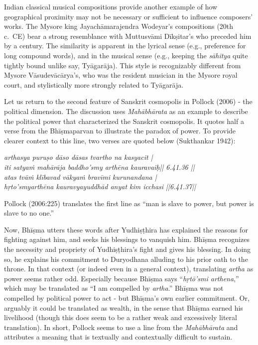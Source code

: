 Indian classical musical compositions provide another example of how geographical proximity may not be necessary or sufficient to influence composers’ works. The Mysore king Jayachāmarajendra Wodeyar’s compositions (20th c.\ CE) bear a strong resemblance with Muttusvāmi Dīkṣitar’s who preceded him by a century. The similarity is apparent in the lyrical sense (e.g., preference for long compound words), and in the musical sense (e.g., keeping the {\sl sāhitya} quite tightly bound unlike say, Tyāgarāja). This style is recognizably different from Mysore Vāsudevācārya’s, who was the resident musician in the Mysore royal court, and stylistically more strongly related to Tyāgarāja. 

Let us return to the second feature of Sanskrit cosmopolis in Pollock (2006) - the political dimension. The discussion uses {\sl Mahābhārata} as an example to describe the political power that characterized the Sanskrit cosmopolis. It quotes half a verse from the Bhīṣmaparvan to illustrate the paradox of power. To provide clearer context to this line, two verses are quoted below (Sukthankar 1942):
\begin{myquote}
{\sl arthasya puruṣo dāso dāsas tvartho na kasyacit |\\
iti satyaṁ mahārāja baddho'smy arthēna kauravaiḥ|| 6.41.36 ||\\
atas tvāṁ klībavad vākyaṁ bravīmi kurunandana |\\
hṛto'smyarthēna kauravyayuddhād anyat kim icchasi ||6.41.37||}
\end{myquote}

Pollock (2006:225) translates the first line as “man is slave to power, but power is slave to no one.”

Now, Bhīṣma utters these words after Yudhiṣṭhira has explained the reasons for fighting against him, and seeks his blessings to vanquish him. Bhīṣma recognizes the necessity and propriety of Yudhiṣṭhira’s fight and gives his blessing. In doing so, he explains his commitment to Duryodhana alluding to his prior oath to the throne. In that context (or indeed even in a general context), translating {\sl artha} as power seems rather odd. Especially because Bhīṣma says “{\sl hṛtō'smi arthena},” which may be translated as “I am compelled by {\sl artha}.” Bhīṣma was not compelled by political power to act - but Bhīṣma's own earlier commitment. Or, arguably it could be translated as wealth, in the sense that Bhīṣma earned his livelihood (though this does seem to be a rather weak and excessively literal translation). In short, Pollock seems to use a line from the {\sl Mahābhārata} and attributes a meaning that is textually and contextually difficult to sustain.

